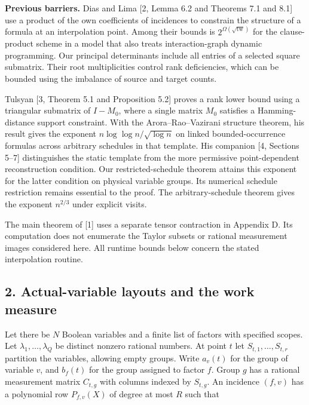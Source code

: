 \documentclass[
  10pt,
]{article}
\begin{document}
\textbf{Previous barriers.} Dias and Lima {[}2, Lemma 6.2 and Theorems
7.1 and 8.1{]} use a product of the own coefficients of incidences to
constrain the structure of a formula at an interpolation point. Among
their bounds is \(2^{\Omega(\sqrt{\operatorname{tw}})}\) for the
clause-product scheme in a model that also treats interaction-graph
dynamic programming. Our principal determinants include all entries of a
selected square submatrix. Their root multiplicities control rank
deficiencies, which can be bounded using the imbalance of source and
target counts.

Tulsyan {[}3, Theorem 5.1 and Proposition 5.2{]} proves a rank lower
bound using a triangular submatrix of \(I-M_0\), where a single matrix
\(M_0\) satisfies a Hamming-distance support constraint. With the
Arora--Rao--Vazirani structure theorem, his result gives the exponent
\(n\log\log n/\sqrt{\log n}\) on linked bounded-occurrence formulas
across arbitrary schedules in that template. His companion {[}4,
Sections 5--7{]} distinguishes the static template from the more
permissive point-dependent reconstruction condition. Our
restricted-schedule theorem attains this exponent for the latter
condition on physical variable groups. Its numerical schedule
restriction remains essential to the proof. The arbitrary-schedule
theorem gives the exponent \(n^{2/3}\) under explicit visits.

The main theorem of {[}1{]} uses a separate tensor contraction in
Appendix D. Its computation does not enumerate the Taylor subsets or
rational measurement images considered here. All runtime bounds below
concern the stated interpolation routine.

\subsection{2. Actual-variable layouts and the work
measure}\label{actual-variable-layouts-and-the-work-measure}

Let there be \(N\) Boolean variables and a finite list of factors with
specified scopes. Let \(\lambda_1,\ldots,\lambda_Q\) be distinct nonzero
rational numbers. At point \(t\) let \(S_{t,1},\ldots,S_{t,r}\)
partition the variables, allowing empty groups. Write \(a_v(t)\) for the
group of variable \(v\), and \(b_f(t)\) for the group assigned to factor
\(f\). Group \(g\) has a rational measurement matrix \(C_{t,g}\) with
columns indexed by \(S_{t,g}\). An incidence \((f,v)\) has a polynomial
row \(P_{f,v}(X)\) of degree at most \(R\) such that
\end{document}
